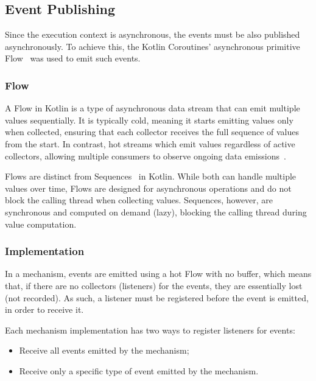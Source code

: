 \subsection{Event Publishing}\label{subsec:event-publishing}

Since the execution context is asynchronous, the events must be also published asynchronously.
To achieve this, the Kotlin Coroutines' asynchronous primitive Flow~\cite{kotlin-flow} was used to emit such events.

\subsubsection{Flow}\label{subsubsec:flow}

A Flow in Kotlin is a type of asynchronous data stream that can emit multiple values sequentially.
It is typically cold, meaning it starts emitting values only when collected,
ensuring that each collector receives the full sequence of values from the start.
In contrast, hot streams which emit values regardless of active collectors,
allowing multiple consumers
to observe ongoing data emissions~\cite{android-stateflow-sharedflow, kotlin-flow}.

Flows are distinct from Sequences~\cite{kotlin-sequences} in Kotlin.
While both can handle multiple values over time,
Flows are designed for asynchronous operations and do not block the calling thread when collecting values.
Sequences, however, are synchronous and computed on demand (lazy), blocking the calling thread during value computation.

\subsubsection{Implementation}\label{subsubsec:event-publishing-implementation}

In a mechanism, events are emitted using a hot Flow with no buffer, which means that, if there are no collectors (listeners) for the events, they are essentially lost (not recorded).
As such, a listener must be registered before the event is emitted, in order to receive it.

Each mechanism implementation has two ways to register listeners for events:

\begin{itemize}
    \item Receive all events emitted by the mechanism;
    \item Receive only a specific type of event emitted by the mechanism.
\end{itemize}

